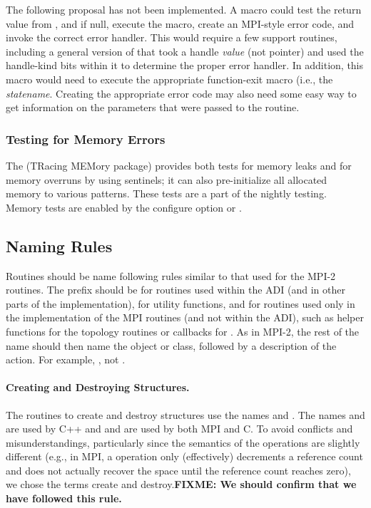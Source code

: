 \documentclass{article}
\def\fixme#1{\marginpar{FIXME:}\textbf{FIXME: #1}}
\begin{document}
The following proposal has not been implemented.
A macro  could test the return value from
, and if null, execute the 
macro, create an MPI-style error code, and invoke the correct error
handler.  This would require a few support routines, including a
general version of  that took a handle
\emph{value} (not pointer) and used the handle-kind bits within it to
determine the proper error handler.  In addition, this macro would
need to execute the appropriate function-exit macro (i.e., the
\emph{statename}\code{)}. Creating the
appropriate error code may also need some easy way to get information
on the parameters that were passed to the routine.

\subsubsection{Testing for Memory Errors}
The  (TRacing MEMory package) provides both tests for
memory 
leaks and for memory overruns by using sentinels; it can also
pre-initialize all allocated memory to various patterns.  These tests
are a part of the nightly testing.
Memory tests are enabled by the configure option
 or .

\subsection{Naming Rules}
Routines should be name following rules similar to that used for the
MPI-2 routines.  The prefix should be  for routines used
within the ADI (and in other parts of the implementation),
 for utility functions, and  for routines used
only in the implementation of the MPI routines (and not within the
ADI), such as helper functions for the topology routines or callbacks
for .  As in MPI-2, the rest of the name should
then name the object or class, followed by a description of the
action.  For example, , not
. 

\paragraph{Creating and Destroying Structures.}
The routines to create and destroy structures use the names
 and 
.  The names  and  are used by
C++ and  and  are used by both MPI and C. 
To avoid conflicts and misunderstandings, particularly since the
semantics of the operations are slightly different (e.g., in MPI, a
 operation only (effectively) decrements a reference count
and does not actually recover the space until the reference count
reaches zero), we chose the terms create and destroy.\fixme{We should
  confirm that we have followed this rule.}
\end{document}
